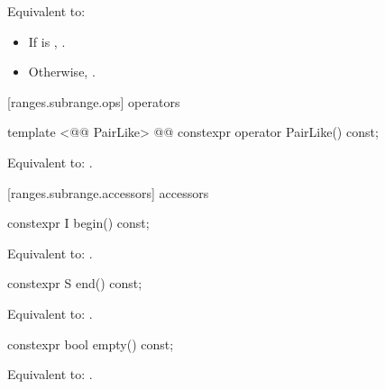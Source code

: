 \begin{itemdescr}
\pnum
\effects Equivalent to:
\begin{itemize}
\item If  is ,
.
\item Otherwise,
.
\end{itemize}
\end{itemdescr}

[ranges.subrange.ops]{ operators}

%
\begin{itemdecl}
template <@@ PairLike>
  @@
constexpr operator PairLike() const;
\end{itemdecl}

\begin{itemdescr}
\pnum
\effects Equivalent to: .
\end{itemdescr}

[ranges.subrange.accessors]{ accessors}

%
\begin{itemdecl}
constexpr I begin() const;
\end{itemdecl}

\begin{itemdescr}
\pnum
\effects Equivalent to: .
\end{itemdescr}

%
\begin{itemdecl}
constexpr S end() const;
\end{itemdecl}

\begin{itemdescr}
\pnum
\effects Equivalent to: .
\end{itemdescr}

%
\begin{itemdecl}
constexpr bool empty() const;
\end{itemdecl}

\begin{itemdescr}
\pnum
\effects Equivalent to: .
\end{itemdescr}

